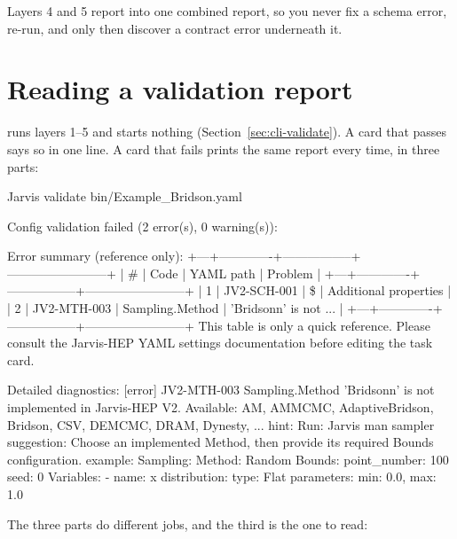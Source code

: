 Layers 4 and 5 report into one combined report, so you never fix a schema error, re-run,
and only then discover a contract error underneath it.

\section{Reading a validation report}
\label{sec:validation}

 runs layers 1--5 and starts nothing
(Section~\ref{sec:cli-validate}). A card that passes says so in one line. A card that
fails prints the same report every time, in three parts:

\begin{terminal}
\begin{jcmd}
Jarvis validate bin/Example_Bridson.yaml
\end{jcmd}
\termsep
\begin{jout}
Config validation failed (2 error(s), 0 warning(s)):

Error summary (reference only):
+---+-------------+-----------------+------------------------+
| # | Code        | YAML path       | Problem                |
+---+-------------+-----------------+------------------------+
| 1 | JV2-SCH-001 | \$               | Additional properties  |
| 2 | JV2-MTH-003 | Sampling.Method | 'Bridsonn' is not ...  |
+---+-------------+-----------------+------------------------+
This table is only a quick reference. Please consult the Jarvis-HEP YAML settings
documentation before editing the task card.

Detailed diagnostics:
  [error] JV2-MTH-003  Sampling.Method
          'Bridsonn' is not implemented in Jarvis-HEP V2. Available: AM,
          AMMCMC, AdaptiveBridson, Bridson, CSV, DEMCMC, DRAM, Dynesty, ...
          hint: Run: Jarvis man sampler
          suggestion: Choose an implemented Method, then provide its
          required Bounds configuration.
          example:
            Sampling:
              Method: Random
              Bounds:
                point_number: 100
                seed: 0
              Variables:
                - name: x
                  distribution:
                    type: Flat
                    parameters: {min: 0.0, max: 1.0}
\end{jout}
\end{terminal}

The three parts do different jobs, and the third is the one to read:

